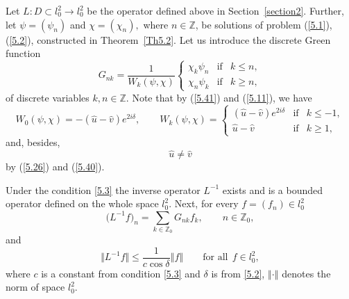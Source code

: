 \documentclass[pdftex]{sigma}
\numberwithin{equation}{section}
\begin{document}
Let $L:D\subset l_{0}^{2}\rightarrow l_{0}^{2}$ be the operator def\/ined
above in Section~\ref{section2}. Further, let $\psi =(\psi _{n})$ and $\chi
=(\chi _{n}),$ where $n\in
\mathbb{Z}
$, be solutions of problem (\ref{5.1}), (\ref{5.2}), constructed in Theorem~\ref{Th5.2}. Let us introduce the discrete Green function%
\begin{equation*}
G_{nk}=\frac{1}{W_{k}(\psi ,\chi )}\left\{
\begin{array}{lll}
\chi _{k}\psi _{n} & \text{if} & k\leq n, \\
\chi _{n}\psi _{k} & \text{if} & k\geq n,%
\end{array}%
\right. %
\end{equation*}%
of discrete variables $k,n\in
\mathbb{Z}
.$ Note that by (\ref{5.41}) and (\ref{5.11}), we have%
\begin{equation}
W_{0}(\psi ,\chi )=-(\widehat{u}-\widehat{v})e^{2i\delta },\qquad
W_{k}(\psi ,\chi )=\left\{
\begin{array}{lll}
(\widehat{u}-\widehat{v})e^{2i\delta } & \text{if} & k\leq -1, \\
\widehat{u}-\widehat{v} & \text{if} & k\geq 1,%
\end{array}%
\right.  \label{6.6}
\end{equation}%
and, besides,%
\begin{equation*}
\widehat{u}\neq \widehat{v}  %
\end{equation*}%
by (\ref{5.26}) and (\ref{5.40}).

\begin{theorem}
\label{Th6.1}Under the condition \eqref{5.3} the inverse operator $L^{-1}$
exists and is a bounded operator defined on the whole space $l_{0}^{2}.$
Next, for every $f=(f_{n})\in l_{0}^{2}$%
\begin{equation}
\big(L^{-1}f\big)_{n}=\sum_{k\in
\mathbb{Z}
_{0}}G_{nk}f_{k},\qquad n\in \mathbb{Z}
_{0},  \label{6.8}
\end{equation}%
and%
\begin{equation}
\big\Vert L^{-1}f\big\Vert \leq \frac{1}{c\cos \delta }\left\Vert
f\right\Vert \qquad \text{for all} \ \ f\in l_{0}^{2},  \label{6.9}
\end{equation}%
where $c$ is a constant from condition \eqref{5.3} and $\delta $ is from \eqref{5.2}, $\left\Vert \cdot \right\Vert $ denotes the norm of space $l_{0}^{2}.$
\end{theorem}
\end{document}
